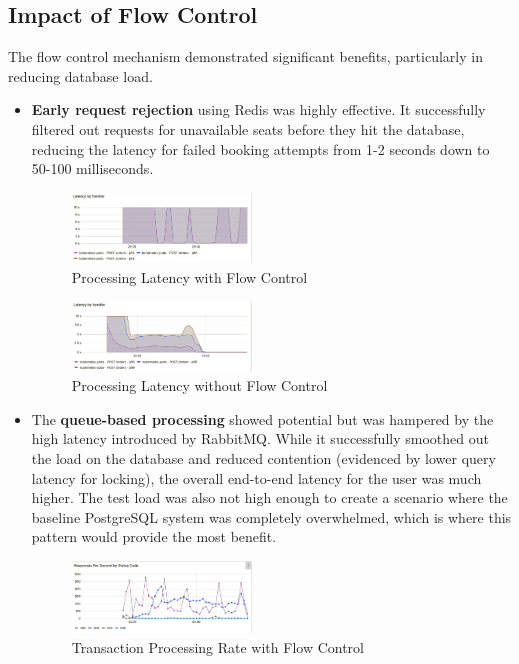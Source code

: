 \subsection{Impact of Flow Control}
The flow control mechanism demonstrated significant benefits, particularly in reducing database load.
\begin{itemize}
    \item \textbf{Early request rejection} using Redis was highly effective. It successfully filtered out requests for unavailable seats before they hit the database, reducing the latency for failed booking attempts from 1-2 seconds down to 50-100 milliseconds.
          \begin{figure}[H]
              \centering
              \includegraphics[width=0.45\textwidth]{resources/chapter-4/latency-fc-pg-stress-0.png}
              \caption{Processing Latency with Flow Control}
              \label{fig:latency-fc}
          \end{figure}

          \begin{figure}[H]
              \centering
              \includegraphics[width=0.45\textwidth]{resources/chapter-4/latency-nofc-pg-stress-0.png}
              \caption{Processing Latency without Flow Control}
              \label{fig:latency-nofc}
          \end{figure}
    \item The \textbf{queue-based processing} showed potential but was hampered by the high latency introduced by RabbitMQ. While it successfully smoothed out the load on the database and reduced contention (evidenced by lower query latency for locking), the overall end-to-end latency for the user was much higher. The test load was also not high enough to create a scenario where the baseline PostgreSQL system was completely overwhelmed, which is where this pattern would provide the most benefit.
          \begin{figure}[H]
              \centering
              \includegraphics[width=0.45\textwidth]{resources/chapter-4/rps-fc-pg-stress-0.png}
              \caption{Transaction Processing Rate with Flow Control}
              \label{fig:rps-fc-pg-stress-0}
          \end{figure}


\end{itemize}
